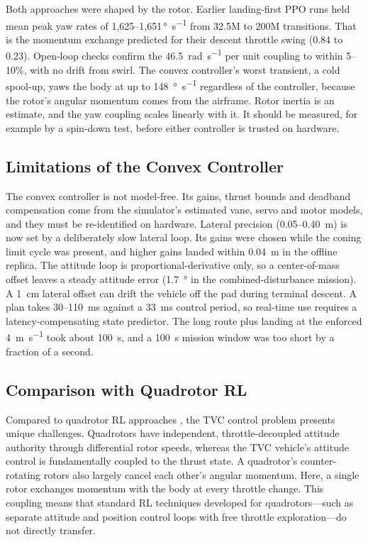 \documentclass[conference]{IEEEtran}
\begin{document}
Both approaches were shaped by the rotor. Earlier landing-first PPO runs held mean peak yaw rates of 1{,}625--1{,}651\,\si{\degree\per\second} from 32.5M to 200M transitions. That is the momentum exchange predicted for their descent throttle swing (0.84 to 0.23). Open-loop checks confirm the \SI{46.5}{\radian\per\second} per unit coupling to within 5--10\%, with no drift from swirl. The convex controller's worst transient, a cold spool-up, yaws the body at up to \SI{148}{\degree\per\second} regardless of the controller, because the rotor's angular momentum comes from the airframe. Rotor inertia is an estimate, and the yaw coupling scales linearly with it. It should be measured, for example by a spin-down test, before either controller is trusted on hardware.

\subsection{Limitations of the Convex Controller}

The convex controller is not model-free. Its gains, thrust bounds and deadband compensation come from the simulator's estimated vane, servo and motor models, and they must be re-identified on hardware. Lateral precision (0.05--\SI{0.40}{\metre}) is now set by a deliberately slow lateral loop. Its gains were chosen while the coning limit cycle was present, and higher gains landed within \SI{0.04}{\metre} in the offline replica. The attitude loop is proportional-derivative only, so a center-of-mass offset leaves a steady attitude error (\SI{1.7}{\degree} in the combined-disturbance mission). A \SI{1}{\centi\metre} lateral offset can drift the vehicle off the pad during terminal descent. A plan takes 30--\SI{110}{\milli\second} against a \SI{33}{\milli\second} control period, so real-time use requires a latency-compensating state predictor. The long route plus landing at the enforced \SI{4}{\metre\per\second} took about \SI{100}{\second}, and a \SI{100}{\second} mission window was too short by a fraction of a second.

\subsection{Comparison with Quadrotor RL}

Compared to quadrotor RL approaches \cite{b2, b3}, the TVC control problem presents unique challenges. Quadrotors have independent, throttle-decoupled attitude authority through differential rotor speeds, whereas the TVC vehicle's attitude control is fundamentally coupled to the thrust state. A quadrotor's counter-rotating rotors also largely cancel each other's angular momentum. Here, a single rotor exchanges momentum with the body at every throttle change. This coupling means that standard RL techniques developed for quadrotors---such as separate attitude and position control loops with free throttle exploration---do not directly transfer.
\end{document}
